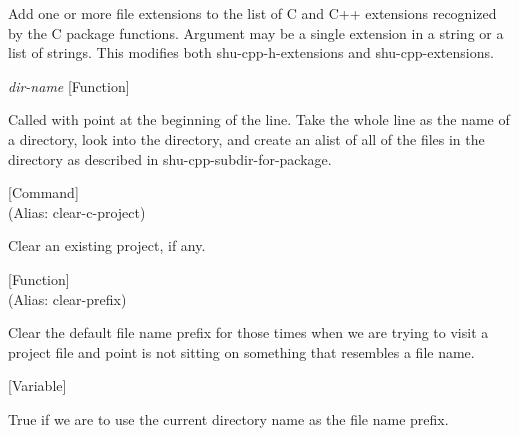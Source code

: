 \begin{doc-string}
Add one or more file extensions to the list of C and C++ extensions recognized by the
C package functions.  Argument may be a single extension in a string or a list of strings.
This modifies both shu-cpp-h-extensions and shu-cpp-extensions.
\end{doc-string}

\vspace{1em}
\noindent
{}
\usebox{\funcname}\emph{dir-name}
 \hfill [Function]

\begin{doc-string}
Called with point at the beginning of the line.  Take the whole line as the
name of a directory, look into the directory, and create an alist of all of the
files in the directory as described in shu-cpp-subdir-for-package.
\end{doc-string}

\vspace{1em}
\noindent
{}
\usebox{\funcname}
 \hfill [Command]\\%
 (Alias: clear-c-project)

\begin{doc-string}
Clear an existing project, if any.
\end{doc-string}

\vspace{1em}
\noindent
{}
\usebox{\funcname}
 \hfill [Function]\\%
 (Alias: clear-prefix)

\begin{doc-string}
Clear the default file name prefix for those times when we are trying to visit
a project file and point is not sitting on something that resembles a file name.
\end{doc-string}

\vspace{1em}
\noindent
{}
\usebox{\funcname}
 \hfill [Variable]

\begin{doc-string}
True if we are to use the current directory name as the file name prefix.
\end{doc-string}

